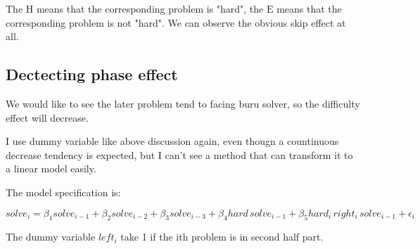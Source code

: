 \documentclass{article}
\begin{document}
The $\mathrm{H}$ means that the corresponding problem is "hard", the $\mathrm{E}$ means that the corresponding
problem is not "hard". We can observe the obvious skip effect at all.


\subsection{Dectecting phase effect}

We would like to see the later problem tend to facing buru solver, so the difficulty effect will decrease.

I use dummy variable like above discussion again, even thougn a countinuous decrease tendency is expected,
but I can't see a method that can transform it to a linear model easily.

The model specification is:

\[
solve_i = \beta_1 solve_{i-1} + \beta_2 solve_{i-2} + \beta_3 solve_{i-3} + \beta_4 hard \, solve_{i-1} +
		  \beta_5 hard_i \, right_i \, solve_{i-1} + \epsilon_i
\]

The dummy variable $left_i$ take 1 if the ith problem is in second half part.
\end{document}
